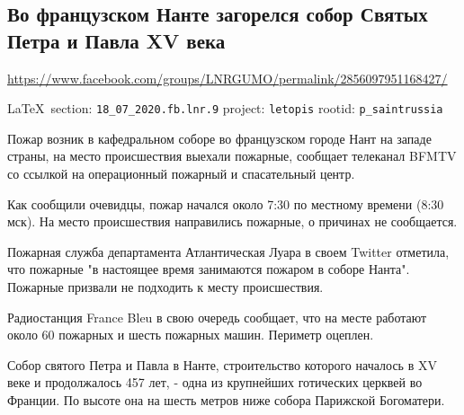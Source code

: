  
 
\subsection{Во французском Нанте загорелся собор Святых Петра и Павла XV века}
\label{sec:18_07_2020.fb.lnr.9}
\url{https://www.facebook.com/groups/LNRGUMO/permalink/2856097951168427/}
  
\vspace{0.5cm}
{\small\LaTeX~section: \verb|18_07_2020.fb.lnr.9| project: \verb|letopis| rootid: \verb|p_saintrussia|}
\vspace{0.5cm}

Пожар возник в кафедральном соборе во французском городе Нант на западе страны,
на место происшествия выехали пожарные, сообщает телеканал BFMTV со ссылкой на
операционный пожарный и спасательный центр.

Как сообщили очевидцы, пожар начался около 7:30 по местному времени (8:30 мск).
На место происшествия направились пожарные, о причинах не сообщается.

Пожарная служба департамента Атлантическая Луара в своем Twitter отметила, что
пожарные "в настоящее время занимаются пожаром в соборе Нанта". Пожарные
призвали не подходить к месту происшествия.

Радиостанция France Bleu в свою очередь сообщает, что на месте работают около
60 пожарных и шесть пожарных машин. Периметр оцеплен.

Собор святого Петра и Павла в Нанте, строительство которого началось в XV веке
и продолжалось 457 лет, - одна из крупнейших готических церквей во Франции. По
высоте она на шесть метров ниже собора Парижской Богоматери. 
